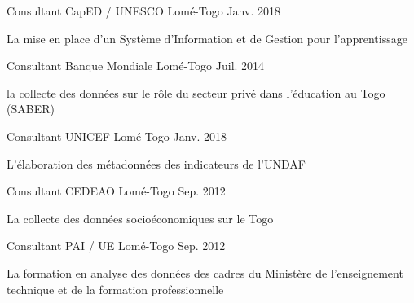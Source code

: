 

\begin{cventries}

  \cventry
    {Consultant} %
    {CapED / UNESCO} %
    {Lomé-Togo} %
    {Janv. 2018} %
    {
      \begin{cvitems} %
        \item {La mise en place d'un Système d'Information et de Gestion pour l'apprentissage}
      \end{cvitems}
    }

  \cventry
    {Consultant} %
    {Banque Mondiale} %
    {Lomé-Togo} %
    {Juil. 2014} %
    {
      \begin{cvitems} %
        \item {la collecte des données sur le rôle du secteur privé dans l’éducation au Togo (SABER)}
      \end{cvitems}
    }

  \cventry
    {Consultant} %
    {UNICEF} %
    {Lomé-Togo} %
    {Janv. 2018} %
    {
      \begin{cvitems} %
        \item {L’élaboration des métadonnées des indicateurs de l’UNDAF}
      \end{cvitems}
    }

  \cventry
    {Consultant} %
    {CEDEAO} %
    {Lomé-Togo} %
    {Sep. 2012} %
    {
      \begin{cvitems} %
        \item {La collecte des données socioéconomiques sur le Togo}
      \end{cvitems}
    }

  \cventry
    {Consultant} %
    {PAI / UE} %
    {Lomé-Togo} %
    {Sep. 2012} %
    {
      \begin{cvitems} %
        \item {La formation en analyse des données des cadres du Ministère de l’enseignement technique et de la formation professionnelle}
      \end{cvitems}
    }


\end{cventries}
